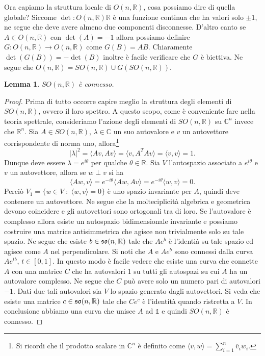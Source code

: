 \documentclass{amsart}
\numberwithin{equation}{section}
\newtheorem{lem}[thm]{Lemma}
\newcommand\bC{{\mathbb C}}
\newcommand\bR{{\mathbb R}}
\newcommand\Id{{\mathds{1}}}
\newcommand{\lie}{\frak s\frak o}
\begin{document}
Ora capiamo la struttura locale di $O(n,\bR)$, cosa possiamo dire di quella globale? Siccome $\det: O(n,\bR)\bR$ \`e una funzione continua che ha valori solo $\pm 1$, ne segue che deve avere almeno due componenti disconnesse. D'altro canto se $A\in O(n,\bR)$ con $\det(A)=-1$ allora possiamo definire $G: O(n,\bR)\to O(n,\bR)$ come $G(B)=AB$. Chiaramente $\det(G(B))=-\det(B)$ inoltre \`e facile verificare che $G$ \`e biettiva. Ne segue che $O(n,\bR)=SO(n,\bR)\cup G(SO(n,\bR))$.
\begin{lem} $SO(n,\bR)$ \`e connesso.
\end{lem}
\begin{proof}
Prima di tutto occorre capire meglio la struttura degli elementi di $SO(n,\bR)$, ovvero il loro spettro. A questo scopo, come \`e conveniente fare nella teoria spettrale, consideriamo l'azione degli elementi di  $SO(n,\bR)$ su $\bC^n$ invece che $\bR^n$.  Sia $A\in SO(n,\bR)$, $\lambda\in \bC$ un suo autovalore  e $v$ un autovettore corrispondente di norma uno, allora\footnote{ Si ricordi che il prodotto scalare in $\bC^n$ \`e definito come $\langle v,w\rangle=\sum_{i=1}^n \overline v_iw_i$.}
\[
|\lambda|^2=\langle Av,Av\rangle=\langle v, A^TAv\rangle=\langle v,v\rangle=1.
\]
Dunque deve essere $\lambda=e^{i\theta}$ per qualche $\theta\in\bR$. Sia $V$ l'autospazio associato a $e^{i\theta}$ e $v$ un autovettore, allora se $w\perp v$ si ha
\[
\langle Aw, v\rangle=e^{-i\theta}\langle Aw, Av\rangle=e^{-i\theta}\langle w, v\rangle=0.
\]
Perci\`o $V_1=\{w\in V\;:\; \langle w,v\rangle=0\}$ \`e uno spazio invariante per $A$, quindi deve contenere un autovettore. Ne segue che la molteciplicit\`a algebrica e geometrica devono coincidere e gli autovettori sono ortogonali tra di loro. Se l'autovalore \`e complesso allora esiste un autospazio bidimensionale invariante e possiamo costruire una matrice antisimmetrica che agisce non trivialmente solo su tale spazio. Ne segue che esiste $b\in \lie(n,\bR)$ tale che $Ae^b$ \`e l'identi\`a su tale spazio ed agisce come $A$ nel perpendicolare. Si noti che $A$ e $Ae^b$ sono connessi dalla curva $Ae^{tb}$, $t\in[0,1]$. In questo modo \`e facile vedere che esiste una curva che connette $A$ con una matrice $C$ che ha autovalori $1$ su tutti gli autospazi su cui $A$ ha un autovalore complesso. Ne segue che $C$ pu\`o avere solo un numero pari di autovalori $-1$. Dati due tali autovalori sia $V$ lo spazio generato dagli autovettori. Si veda che esiste una matrice $c\in \lie(n,\bR)$ tale che $Ce^c$ \`e l'identit\`a quando ristretta a $V$. In conclusione abbiamo una curva che unisce $A$ ad $\Id$ e quindi $SO(n,\bR)$ \`e connesso.
\end{proof}
\end{document}
